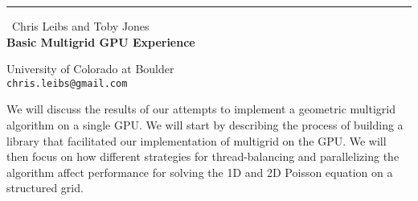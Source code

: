 \documentclass{report}
\begin{document}
\begin{center}
\rule{6in}{1pt} \
{\large Chris Leibs and Toby Jones\\
{\bf Basic Multigrid GPU Experience}}

University of Colorado at Boulder
\\
{\tt chris.leibs@gmail.com}\\
\end{center}

We will discuss the results of our attempts to implement a
geometric multigrid algorithm on a single GPU. We will start by describing
the process of building a library that facilitated our implementation of
multigrid on the GPU. We will then focus on how different strategies for
thread-balancing and parallelizing the algorithm affect performance for
solving the 1D and 2D Poisson equation on a structured grid.
\end{document}
